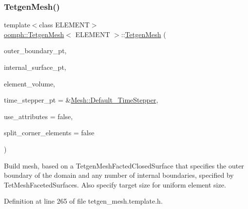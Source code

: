 \mbox{\label{classoomph_1_1TetgenMesh_afe49b6f5fc0ff75d8ddfbfab204d6f20}} 
\subsubsection{\texorpdfstring{Tetgen\+Mesh()}{TetgenMesh()}\hspace{0.1cm}{\footnotesize\ttfamily [6/6]}}
{\footnotesize\ttfamily template$<$class E\+L\+E\+M\+E\+NT$>$ \\
\hyperlink{classoomph_1_1TetgenMesh}{oomph\+::\+Tetgen\+Mesh}$<$ E\+L\+E\+M\+E\+NT $>$\+::\hyperlink{classoomph_1_1TetgenMesh}{Tetgen\+Mesh} (\begin{DoxyParamCaption}\item[{\hyperlink{classoomph_1_1TetMeshFacetedClosedSurface}{Tet\+Mesh\+Faceted\+Closed\+Surface} $\ast$const \&}]{outer\+\_\+boundary\+\_\+pt,  }\item[{\hyperlink{classoomph_1_1Vector}{Vector}$<$ \hyperlink{classoomph_1_1TetMeshFacetedSurface}{Tet\+Mesh\+Faceted\+Surface} $\ast$$>$ \&}]{internal\+\_\+surface\+\_\+pt,  }\item[{const double \&}]{element\+\_\+volume,  }\item[{\hyperlink{classoomph_1_1TimeStepper}{Time\+Stepper} $\ast$}]{time\+\_\+stepper\+\_\+pt = {\ttfamily \&\hyperlink{classoomph_1_1Mesh_a12243d0fee2b1fcee729ee5a4777ea10}{Mesh\+::\+Default\+\_\+\+Time\+Stepper}},  }\item[{const bool \&}]{use\+\_\+attributes = {\ttfamily false},  }\item[{const bool \&}]{split\+\_\+corner\+\_\+elements = {\ttfamily false} }\end{DoxyParamCaption})\hspace{0.3cm}{\ttfamily [inline]}}



Build mesh, based on a Tetgen\+Mesh\+Facted\+Closed\+Surface that specifies the outer boundary of the domain and any number of internal boundaries, specified by Tet\+Mesh\+Faceted\+Surfaces. Also specify target size for uniform element size. 



Definition at line 265 of file tetgen\+\_\+mesh.\+template.\+h.



